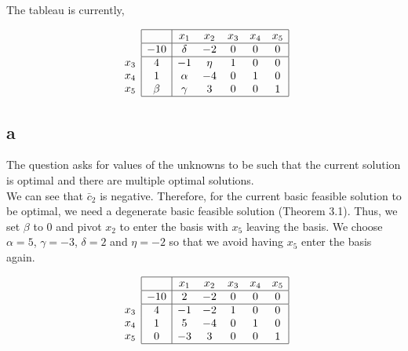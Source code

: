 The tableau is currently, 


$$
\begin{array}{c}
\\
 \\
x_3 \\
x_4 \\ 
x_5 \\
\end{array}
\begin{array}{|c|ccccc|}
    \hline
    & x_1 & x_2 & x_3 & x_4 & x_5\\ \hline
  -10 & \delta & -2 & 0 & 0 & 0\\ \hline
  4 & -1 & \eta & 1 & 0 & 0\\
  1 & \alpha & -4 & 0 & 1 & 0\\
  \beta & \gamma & 3 & 0 & 0 & 1\\\hline
\end{array}
$$

\subsection*{a}
The question asks for values of the unknowns to be such that the current solution is optimal and there are multiple optimal solutions. \\

We can see that $\bar{c}_2$ is negative. Therefore, for the current basic feasible solution to be optimal, we need a degenerate basic feasible solution (Theorem 3.1). Thus, we set $\beta$ to $0$ and pivot $x_2$ to enter the basis with $x_5$ leaving the basis. We choose $\alpha = 5$, $\gamma = -3$, $\delta = 2$ and $\eta = -2$ so that we avoid having $x_5$ enter the basis again. 

$$
\begin{array}{c}
\\
 \\
x_3 \\
x_4 \\ 
x_5 \\
\end{array}
\begin{array}{|c|ccccc|}
    \hline
    & x_1 & x_2 & x_3 & x_4 & x_5\\ \hline
  -10 & 2 & -2 & 0 & 0 & 0\\ \hline
  4 & -1 & -2 & 1 & 0 & 0\\
  1 & 5 & -4 & 0 & 1 & 0\\
  0 & -3 & 3 & 0 & 0 & 1\\\hline
\end{array}
$$



